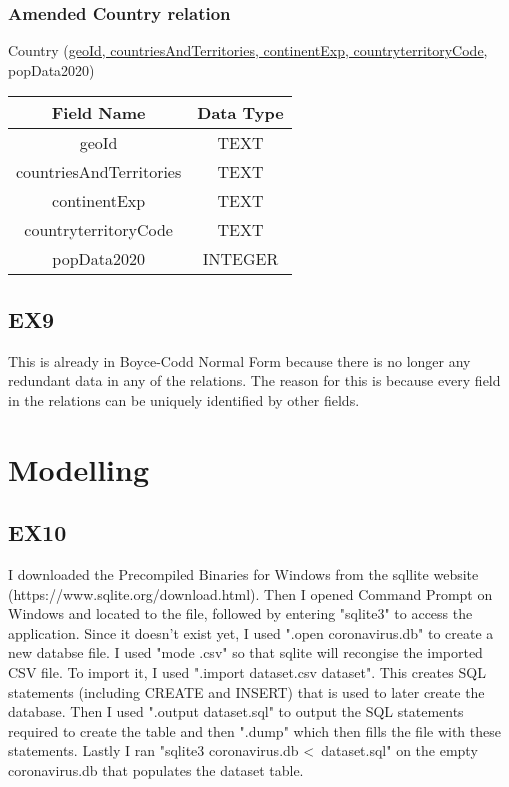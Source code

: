 \documentclass{article}
\begin{document}
\subsubsection{Amended Country relation}

Country (\underline{geoId, countriesAndTerritories, continentExp, countryterritoryCode}, popData2020)

\begin{center}
\begin{tabular}{ |c|c| }
\hline
\textbf{Field Name} & \textbf{Data Type} \\ \hline
geoId & TEXT \\ \hline
countriesAndTerritories & TEXT \\ \hline
continentExp & TEXT \\ \hline
countryterritoryCode & TEXT \\ \hline
popData2020 & INTEGER \\ \hline
\end{tabular}
\end{center}

\subsection{EX9}

This is already in Boyce-Codd Normal Form because there is no longer any redundant data in any of the relations. The reason for this is because every field in the relations can be uniquely identified by other fields.

\section{Modelling}

\subsection{EX10}

I downloaded the Precompiled Binaries for Windows from the sqllite website (https://www.sqlite.org/download.html). Then I opened Command Prompt on Windows and located to the file, followed by entering "sqlite3" to access the application. Since it doesn't exist yet, I used ".open coronavirus.db" to create a new databse file. I used "mode .csv" so that sqlite will recongise the imported CSV file. To import it, I used ".import dataset.csv dataset". This creates SQL statements (including CREATE and INSERT) that is used to later create the database. Then I used ".output dataset.sql" to output the SQL statements required to create the table and then ".dump" which then fills the file with these statements. Lastly I ran "sqlite3 coronavirus.db \textless\ dataset.sql" on the empty coronavirus.db that populates the dataset table.
\end{document}
